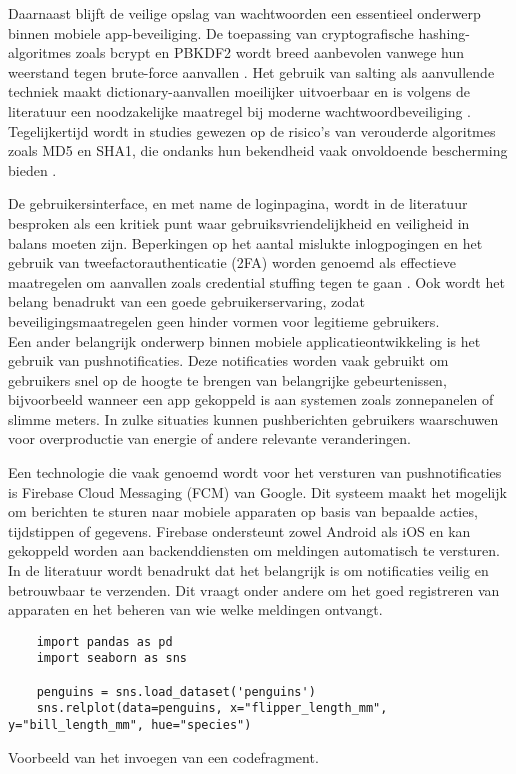 Daarnaast blijft de veilige opslag van wachtwoorden een essentieel onderwerp binnen mobiele app-beveiliging. De toepassing van cryptografische hashing-algoritmes zoals bcrypt en PBKDF2 wordt breed aanbevolen vanwege hun weerstand tegen brute-force aanvallen \autocite{Gupta2022}. Het gebruik van salting als aanvullende techniek maakt dictionary-aanvallen moeilijker uitvoerbaar en is volgens de literatuur een noodzakelijke maatregel bij moderne wachtwoordbeveiliging \autocite{Arias2025}. Tegelijkertijd wordt in studies gewezen op de risico’s van verouderde algoritmes zoals MD5 en SHA1, die ondanks hun bekendheid vaak onvoldoende bescherming bieden \autocite{ReesCarter2024}.

De gebruikersinterface, en met name de loginpagina, wordt in de literatuur besproken als een kritiek punt waar gebruiksvriendelijkheid en veiligheid in balans moeten zijn. Beperkingen op het aantal mislukte inlogpogingen en het gebruik van tweefactorauthenticatie (2FA) worden genoemd als effectieve maatregelen om aanvallen zoals credential stuffing tegen te gaan \autocite{Chinnasamy2025, Jurisons2024}. Ook wordt het belang benadrukt van een goede gebruikerservaring, zodat beveiligingsmaatregelen geen hinder vormen voor legitieme gebruikers.\\

Een ander belangrijk onderwerp binnen mobiele applicatieontwikkeling is het gebruik van pushnotificaties. Deze notificaties worden vaak gebruikt om gebruikers snel op de hoogte te brengen van belangrijke gebeurtenissen, bijvoorbeeld wanneer een app gekoppeld is aan systemen zoals zonnepanelen of slimme meters. In zulke situaties kunnen pushberichten gebruikers waarschuwen voor overproductie van energie of andere relevante veranderingen.

Een technologie die vaak genoemd wordt voor het versturen van pushnotificaties is Firebase Cloud Messaging (FCM) van Google. Dit systeem maakt het mogelijk om berichten te sturen naar mobiele apparaten op basis van bepaalde acties, tijdstippen of gegevens. Firebase ondersteunt zowel Android als iOS en kan gekoppeld worden aan backenddiensten om meldingen automatisch te versturen. In de literatuur wordt benadrukt dat het belangrijk is om notificaties veilig en betrouwbaar te verzenden. Dit vraagt onder andere om het goed registreren van apparaten en het beheren van wie welke meldingen ontvangt.

\begin{listing}
  \begin{verbatim}
    import pandas as pd
    import seaborn as sns

    penguins = sns.load_dataset('penguins')
    sns.relplot(data=penguins, x="flipper_length_mm", y="bill_length_mm", hue="species")
  \end{verbatim}
  \caption[Voorbeeld codefragment]{Voorbeeld van het invoegen van een codefragment.}
\end{listing}


